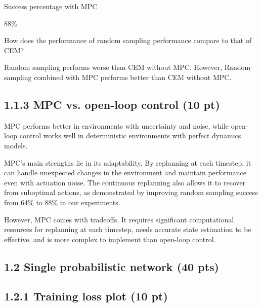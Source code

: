\documentclass[12pt]{article}
\begin{document}
Success percentage with MPC 
\begin{tcolorbox}[fit,height=1cm, width=5cm, blank, borderline={1pt}{1pt},nobeforeafter]
\begin{center}
    88\%
\end{center}
\end{tcolorbox}

How does the performance of random sampling performance compare to that of CEM?
\begin{tcolorbox}[fit,height=20em, width=40em, blank, borderline={1pt}{1pt},nobeforeafter]
    Random sampling performs worse than CEM without MPC. However, Random sampling combined with MPC performs better than CEM without MPC.
\end{tcolorbox}

\subsection*{1.1.3 MPC vs. open-loop control (10 pt)}

\begin{tcolorbox}[fit,height=20em, width=40em, blank, borderline={1pt}{1pt},nobeforeafter]
    MPC performs better in environments with uncertainty and noise, while open-loop control works well in deterministic environments with perfect dynamics models.

    MPC's main strengths lie in its adaptability. By replanning at each timestep, it can handle unexpected changes in the environment and maintain performance even with actuation noise. The continuous replanning also allows it to recover from suboptimal actions, as demonstrated by improving random sampling success from 64\% to 88\% in our experiments.

    However, MPC comes with tradeoffs. It requires significant computational resources for replanning at each timestep, needs accurate state estimation to be effective, and is more complex to implement than open-loop control.
\end{tcolorbox}


\subsection*{1.2 Single probabilistic network (40 pts)}

\subsection*{1.2.1 Training loss plot (10 pt)}
\end{document}
